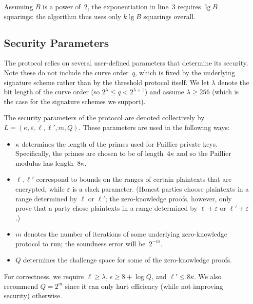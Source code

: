 \documentclass[11pt]{article}
\def\eps{\varepsilon}
\newcommand{\?}[1]{\stackrel{?}{#1}}
\begin{document}
\noindent
Assuming $B$ is a power of~2, the exponentiation in line~3 requires $\lg B$ squarings; the algorithm thus uses only $k\lg B$ squarings overall.

\subsection{Security Parameters}
The protocol relies on several user-defined parameters that determine its security. Note  these do not include the curve order~$q$, which is fixed by the underlying signature scheme  rather than by the threshold protocol itself.
We let $\lambda$ denote the bit length of the curve order (so $2^\lambda \leq q < 2^{\lambda+1}$) and assume $\lambda\geq 256$ (which is the case for the signature schemes we support).

The security parameters of the protocol are denoted collectively by $L = (\kappa, \varepsilon, \ell, \ell', m, Q)$. 
These parameters are used in the following ways:
\begin{itemize}
    \item $\kappa$ determines the length of the primes used for Paillier private keys. Specifically, the primes are chosen to be of length~$4\kappa$ and so the Paillier modulus has length~$8\kappa$.

    \item $\ell, \ell'$ correspond to bounds on the ranges of certain plaintexts that are encrypted, while %
    $\eps$ is a slack parameter. (Honest parties choose plaintexts in a range determined by $\ell$ or $\ell'$; the zero-knowledge proofs, however, only prove that a party chose plaintexts in a range determined by $\ell+\eps$ or $\ell'+\eps$.)

    \item $m$ denotes the number of iterations of some underlying zero-knowledge protocol to run; the soundness error will be~$2^{-m}$.

    \item $Q$ determines the challenge space for some of the zero-knowledge proofs.
\end{itemize}
For correctness, we require
$\ell \geq \lambda$,
    $\epsilon \geq 8 + \log Q$, and
    $\ell' \leq 8\kappa$.
We also recommend $Q=2^m$ since it can only hurt efficiency (while not improving security) otherwise. %
\end{document}
